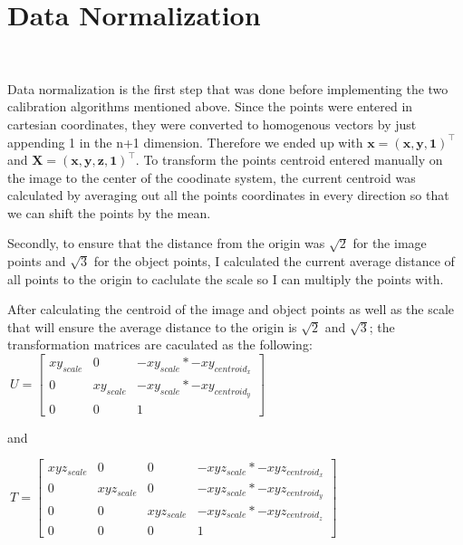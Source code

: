 \documentclass[]{article}
\begin{document}
\section{Data Normalization}\

Data normalization is the first step that was done before implementing the two calibration algorithms mentioned above. Since the points were entered in cartesian coordinates, they were converted to homogenous vectors by just appending 1 in the n+1 dimension. Therefore we ended up with $\mathbf{ x = (x, y, 1)}^\intercal$  and $\mathbf{ X = (x, y, z, 1)}^\intercal$. To transform the points centroid entered manually on the image to the center of the coodinate system, the current centroid was calculated by averaging out all the points coordinates in every direction so that we can shift the points by the mean. 

Secondly, to ensure that the distance from the origin was $\sqrt{2}$ for the image points and $\sqrt{3}$ for the object points, I calculated the current average distance of all points to the origin to caclulate the scale so I can multiply the points with.

After calculating the centroid of the image and object points as well as the scale that will ensure the average distance to the origin is $\sqrt{2}$ and $\sqrt{3}$; the transformation matrices are caculated as the following: \\
$\
U =
\begin{bmatrix}
	xy_{scale}       & 0 &  -xy_{scale}* -xy_{centroid_x}\\
	0     & xy_{scale} & -xy_{scale}* -xy_{centroid_y}\\
	0       & 0 & 1
\end{bmatrix}$

and 

$\
T =
\begin{bmatrix}
xyz_{scale}       & 0  & 0 & -xyz_{scale}* -xyz_{centroid_x}\\
0     & xyz_{scale} & 0 & -xyz_{scale}* -xyz_{centroid_y}\\
0     & 0 &  xyz_{scale}  & -xyz_{scale}* -xyz_{centroid_z}\\
0       & 0 & 0 & 1
\end{bmatrix}$
\end{document}
